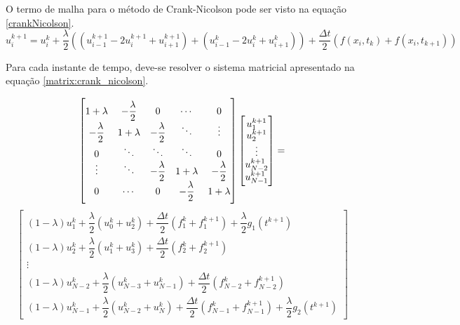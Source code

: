 \documentclass[12pt]{article}
\begin{document}
\begin{spacing}{1.5}
O termo de malha para o método de Crank-Nicolson pode ser visto na equação \eqref{crankNicolson}.
\begin{equation} \label{crankNicolson}
u_{i}^{k+1} = u_i^k + \dfrac{\lambda}{2}((u^{k+1}_{i-1} - 2u^{k+1}_{i} + u_{i+1}^{k+1}) + (u^{k}_{i-1} -2u^{k}_i + u^k_{i+1})) + \dfrac{\Delta t}{2}(f(x_i,t_k) + f(x_{i},t_{k+1}))
\end{equation}

Para cada instante de tempo, deve-se resolver o sistema matricial apresentado na equação \eqref{matrix:crank_nicolson}.

\vspace{1cm}
\begin{equation}\label{matrix:crank_nicolson}
    \renewcommand*{\arraystretch}{0.75}
    \begin{bmatrix}
    1+\lambda & -\dfrac{\lambda}{2} & 0 & \cdots & 0\\
    -\dfrac{\lambda}{2} & 1+\lambda & -\dfrac{\lambda}{2} & \ddots & \vdots\\
    0 & \ddots & \ddots & \ddots & 0 \\
    \vdots & \ddots & -\dfrac{\lambda}{2} & 1+\lambda & -\dfrac{\lambda}{2} \\
    0 & \cdots & 0 & -\dfrac{\lambda}{2} & 1+\lambda
    \end{bmatrix}
    \begin{bmatrix}
    u_1^{k+1} \\
    u_2^{k+1} \\
    \vdots \\
    u_{N-2}^{k+1} \\
    u_{N-1}^{k+1}
    \end{bmatrix}
    =
\end{equation}
\begin{equation*}
    \begin{bmatrix}
    (1-\lambda)u_1^k + \dfrac{\lambda}{2}(u_0^k + u_2^k) + \dfrac{\Delta t}{2}(f_1^{k}+f_1^{k+1}) + \dfrac{\lambda}{2} g_1(t^{k+1}) \\
    (1-\lambda)u_2^k + \dfrac{\lambda}{2}(u_1^k + u_3^k) + \dfrac{\Delta t}{2}(f_2^{k}+f_2^{k+1}) \\
    \vdots \\
    (1-\lambda)u_{N-2}^k + \dfrac{\lambda}{2}(u_{N-3}^k + u_{N-1}^k) + \dfrac{\Delta t}{2}(f_{N-2}^{k}+f_{N-2}^{k+1}) \\
    (1-\lambda)u_{N-1}^k + \dfrac{\lambda}{2}(u_{N-2}^k + u_{N}^k) + \dfrac{\Delta t}{2}(f_{N-1}^{k}+f_{N-1}^{k+1}) + \dfrac{\lambda}{2} g_2(t^{k+1})
    \end{bmatrix}
\end{equation*}


\end{spacing}
\end{document}
